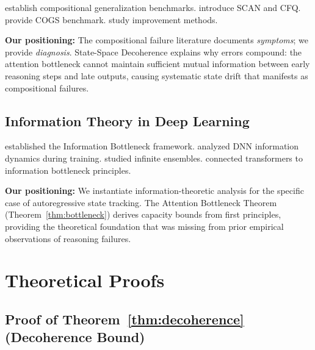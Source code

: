 \documentclass{article}
\theoremstyle{plain}
\theoremstyle{definition}
\theoremstyle{remark}
\begin{document}
\citet{lake2018generalization} establish compositional generalization benchmarks. \citet{keysers2020measuring} introduce SCAN and CFQ. \citet{kim2020cogs} provide COGS benchmark. \citet{ontanon2022making} study improvement methods.

\textbf{Our positioning:} The compositional failure literature documents \emph{symptoms}; we provide \emph{diagnosis}. State-Space Decoherence explains why errors compound: the attention bottleneck cannot maintain sufficient mutual information between early reasoning steps and late outputs, causing systematic state drift that manifests as compositional failures.

\subsection{Information Theory in Deep Learning}

\citet{tishby2015information} established the Information Bottleneck framework. \citet{shwartzziv2017opening} analyzed DNN information dynamics during training. \citet{goldfeld2020information} studied infinite ensembles. \citet{kirsch2024general} connected transformers to information bottleneck principles.

\textbf{Our positioning:} We instantiate information-theoretic analysis for the specific case of autoregressive state tracking. The Attention Bottleneck Theorem (Theorem~\ref{thm:bottleneck}) derives capacity bounds from first principles, providing the theoretical foundation that was missing from prior empirical observations of reasoning failures.


\section{Theoretical Proofs}
\label{app:proofs}

\subsection{Proof of Theorem~\ref{thm:decoherence} (Decoherence Bound)}
\end{document}
